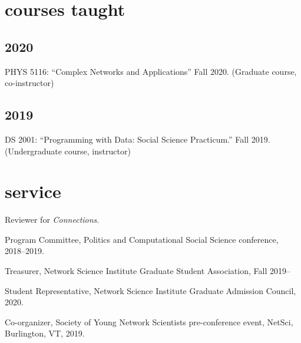 \documentclass[11pt, letter]{article}
\begin{document}
\vspace{2mm}
\section{courses taught}
\subsection{2020}
\begin{hangparas}{.25in}{1}
PHYS 5116: ``Complex Networks and Applications'' Fall 2020. (Graduate course,
co-instructor)
\end{hangparas}
\vspace{1mm}

\subsection{2019}
\begin{hangparas}{.25in}{1}
DS 2001: ``Programming with Data: Social Science Practicum.'' Fall 2019.
(Undergraduate course, instructor) \vspace{2mm}
\end{hangparas}


 \section{service}
 Reviewer for \textit{Connections}.

 Program Committee, Politics and Computational Social Science conference,
 2018--2019.

 Treasurer, Network Science Institute Graduate Student Association, Fall 2019--

 Student Representative, Network Science Institute Graduate Admission Council,
 2020.

 Co-organizer, Society of Young Network Scientists pre-conference event, NetSci,
 Burlington, VT, 2019.
\end{document}
